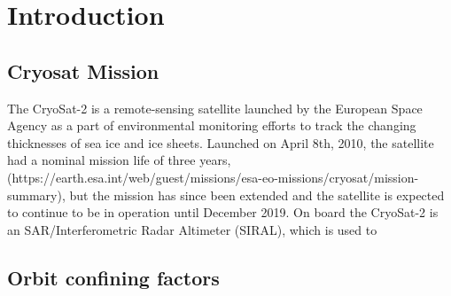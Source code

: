 \section{Introduction}

\subsection{Cryosat Mission}

The CryoSat-2 is a remote-sensing satellite launched by the European Space Agency as a part of environmental monitoring efforts to track the changing thicknesses of sea ice and ice sheets. Launched on April 8th, 2010, the satellite had a nominal mission life of three years, (https://earth.esa.int/web/guest/missions/esa-eo-missions/cryosat/mission-summary), but the mission has since been extended and the satellite is expected to continue to be in operation until December 2019. On board the CryoSat-2 is an 
SAR/Interferometric Radar Altimeter (SIRAL), which is used to 

\subsection{Orbit confining factors}